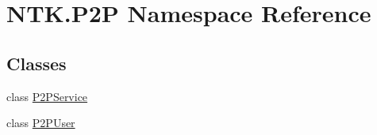 \hypertarget{namespace_n_t_k_1_1_p2_p}{}\section{N\+T\+K.\+P2P Namespace Reference}
\label{namespace_n_t_k_1_1_p2_p}
\subsection*{Classes}
\begin{DoxyCompactItemize}
\item 
class \mbox{\hyperlink{class_n_t_k_1_1_p2_p_1_1_p2_p_service}{P2\+P\+Service}}
\item 
class \mbox{\hyperlink{class_n_t_k_1_1_p2_p_1_1_p2_p_user}{P2\+P\+User}}
\end{DoxyCompactItemize}
